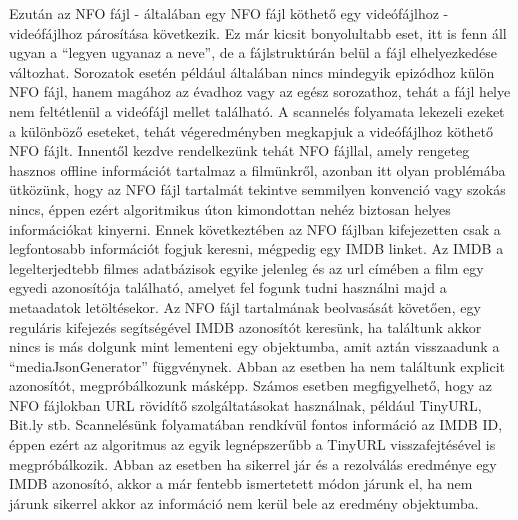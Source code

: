 Ezután az NFO fájl - általában egy NFO fájl köthető egy videófájlhoz - videófájlhoz párosítása következik. Ez már kicsit bonyolultabb eset, itt is fenn áll ugyan a ``legyen ugyanaz a neve'', de a fájlstruktúrán belül a fájl elhelyezkedése változhat. Sorozatok esetén például általában nincs mindegyik epizódhoz külön NFO fájl, hanem magához az évadhoz vagy az egész sorozathoz, tehát a fájl helye nem feltétlenül a videófájl mellet található. A scannelés folyamata lekezeli ezeket a különböző eseteket, tehát végeredményben megkapjuk a videófájlhoz köthető NFO fájlt.
Innentől kezdve rendelkezünk tehát NFO fájllal, amely rengeteg hasznos offline információt tartalmaz a filmünkről, azonban itt olyan problémába ütközünk, hogy az NFO fájl tartalmát tekintve semmilyen konvenció vagy szokás nincs, éppen ezért algoritmikus úton kimondottan nehéz biztosan helyes információkat kinyerni. Ennek következtében az NFO fájlban kifejezetten csak a legfontosabb információt fogjuk keresni, mégpedig egy IMDB linket. Az IMDB a legelterjedtebb filmes adatbázisok egyike jelenleg és az url címében a film egy egyedi azonosítója található, amelyet fel fogunk tudni használni majd a metaadatok letöltésekor. Az NFO fájl tartalmának beolvasását követően, egy reguláris kifejezés segítségével IMDB azonosítót keresünk, ha találtunk akkor nincs is más dolgunk mint lementeni egy objektumba, amit aztán visszaadunk a ``mediaJsonGenerator'' függvénynek. Abban az esetben ha nem találtunk explicit azonosítót, megpróbálkozunk másképp.
Számos esetben megfigyelhető, hogy az NFO fájlokban URL rövidítő szolgáltatásokat használnak, például TinyURL, Bit.ly stb. Scannelésünk folyamatában rendkívül fontos információ az IMDB ID, éppen ezért az algoritmus az egyik legnépszerűbb a TinyURL visszafejtésével is megpróbálkozik. Abban az esetben ha sikerrel jár és a rezolválás eredménye egy IMDB azonosító, akkor a már fentebb ismertetett módon járunk el, ha nem járunk sikerrel akkor az információ nem kerül bele az eredmény objektumba.

